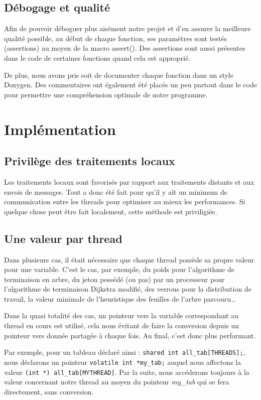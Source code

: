 \documentclass[a4paper,11pt]{report}
\newcommand{\ensp}[1]{\selectlanguage{english}#1\selectlanguage{french}}
\newcommand{\var}[1]{\ensp{\textit{#1}}}
\newcommand{\func}[1]{\ensp{\textsf{#1}}}
\begin{document}
\section{Débogage et qualité}

Afin de pouvoir déboguer plus aisément notre projet et d'en assurer la
meilleure qualité possible, au début de chaque fonction, ses paramètres sont
testés (assertions) au moyen de la macro \func{assert()}. Des assertions sont
aussi présentes dans le code de certaines fonctions quand cela est approprié.

De plus, nous avons pris soit de documenter chaque fonction dans un style
Doxygen. Des commentaires ont également été placés un peu partout dans le code
pour permettre une compréhension optimale de notre programme.


\chapter{Implémentation}

\section{Privilège des traitements locaux}

Les traitements locaux sont favorisés par rapport aux traitements distants et
aux envois de messages. Tout a donc été fait pour qu'il y aît un minimum de
communication entre les threads pour optimiser au mieux les performances. Si
quelque chose peut être fait localement, cette méthode est priviligiée.

\section{Une valeur par thread}

Dans plusieurs cas, il était nécessaire que chaque thread possède sa propre
valeur pour une variable. C'est le cas, par exemple, du poids pour
l'algorithme de terminaison en arbre, du jeton possédé (ou pas) par un
processeur pour l'algorithme de terminaison Dijkstra modifié, des verrous pour
la distribution de travail, la valeur minimale de l'heuristique des feuilles
de l'arbre parcouru\dots

Dans la quasi totalité des cas, un pointeur vers la variable correspondant au
thread en cours est utilisé, cela nous évitant de faire la conversion depuis
un pointeur vers donnée partagée à chaque fois. Au final, c'est donc plus
performant.

Par exemple, pour un tableau déclaré ainsi : \og%
\verb!shared int all_tab[THREADS];!\fg, nous déclarons un pointeur \og%
\verb!volatile int *my_tab;!\fg{} auquel nous affectons la valeur \og%
\verb!(int *) all_tab[MYTHREAD]!\fg. Par la suite, nous accéderons toujours à
la valeur concernant notre thread au moyen du pointeur \var{my\_tab} qui se
fera directement, sans conversion.
\end{document}
